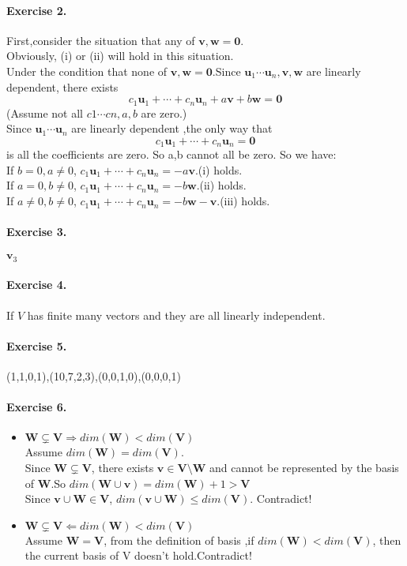 \documentclass{article}
\begin{document}
\paragraph{Exercise 2.}
First,consider the situation that any of $\mathbf{v},\mathbf{w}=\mathbf{0}$.\\Obviously, (i) or (ii) will hold in this situation.\\
Under the condition that none of $\mathbf{v},\mathbf{w}=\mathbf{0}$.Since $\mathbf{u}_1\cdots\mathbf{u}_n,\mathbf{v},\mathbf{w}$ are linearly dependent, there exists 
\[
    c_1\mathbf{u}_1+\cdots+c_n\mathbf{u}_n+a\mathbf{v}+b\mathbf{w}=\mathbf{0} 
\]
(Assume not all $c1 \cdots cn,a,b$ are zero.)\\
Since $\mathbf{u}_1\cdots\mathbf{u}_n$ are linearly dependent ,the only way that
\[
    c_1\mathbf{u}_1+\cdots+c_n\mathbf{u}_n=\mathbf{0} 
\]
is all the coefficients are zero. So a,b cannot all be zero. So we have:\\
If $b=0,a\neq 0$, $c_1\mathbf{u}_1+\cdots+c_n\mathbf{u}_n=-a\mathbf{v}$.(i) holds.\\
If $a=0,b\neq 0$, $c_1\mathbf{u}_1+\cdots+c_n\mathbf{u}_n=-b\mathbf{w}$.(ii) holds.\\
If $a\neq 0,b\neq 0$, $c_1\mathbf{u}_1+\cdots+c_n\mathbf{u}_n=-b\mathbf{w}-\mathbf{v}$.(iii) holds.

\paragraph{Exercise 3.}$\mathbf{v}_3$
\paragraph{Exercise 4.}If $V$ has finite many vectors and they are all linearly independent.
\paragraph{Exercise 5.}(1,1,0,1),(10,7,2,3),(0,0,1,0),(0,0,0,1)
\paragraph{Exercise 6.}\begin{itemize}
\item $\mathbf{W} \subsetneq \mathbf{V} \Rightarrow dim(\mathbf{W}) < dim(\mathbf{V})$\\
    Assume $dim(\mathbf{W}) = dim(\mathbf{V})$.\\ Since $\mathbf{W} \subsetneq \mathbf{V}$, there exists $\mathbf{v} \in \mathbf{V} \setminus \mathbf{W}$ and cannot be represented by the basis of $\mathbf{W}$.So $dim(\mathbf{W}\cup \mathbf{v})=dim(\mathbf{W})+1>\mathbf{V}$\\
    Since $\mathbf{v} \cup \mathbf{W} \in \mathbf{V}$, $dim(\mathbf{v} \cup \mathbf{W} ) \leq dim (\mathbf{V})$. Contradict!
\item $\mathbf{W} \subsetneq \mathbf{V} \Leftarrow dim(\mathbf{W}) < dim(\mathbf{V})$\\
    Assume $\mathbf{W}=\mathbf{V}$, from the definition of basis ,if $dim(\mathbf{W}) < dim(\mathbf{V})$, then the current basis of V doesn't hold.Contradict!
\end{itemize} 
\end{document}
